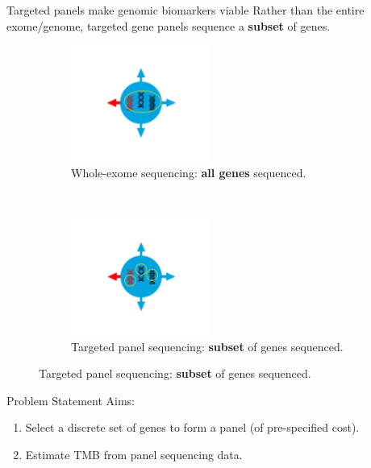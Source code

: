 \documentclass{beamer}
\begin{document}
\begin{frame}{Targeted panels make genomic biomarkers viable}
Rather than the entire exome/genome, targeted gene panels sequence a \textbf{subset} of genes.

\begin{figure}[t!]
    \centering
    \begin{subfigure}[t]{0.45\textwidth}
        \centering
        \includegraphics[height=1.5in]{figures/IC5.png}
        \caption{Whole-exome sequencing: \textbf{all genes} sequenced.}
    \end{subfigure}
    ~ 
    \begin{subfigure}[t]{0.45\textwidth}
        \centering
        \includegraphics[height=1.5in]{figures/IC6.png}
        \caption{Targeted panel sequencing: \textbf{subset} of genes sequenced.}
    \end{subfigure}
\end{figure}

\end{frame}
\begin{frame}{Problem Statement}
Aims: 

\begin{enumerate}[1]
\item Select a discrete set of genes to form a panel (of pre-specified cost). 
\item Estimate TMB from panel sequencing data.
\end{enumerate} 
~\\
\end{frame}
\end{document}
